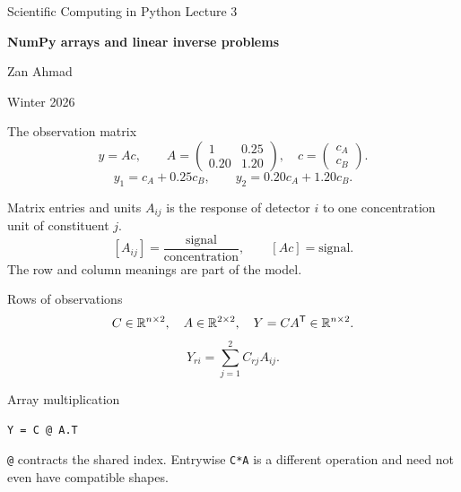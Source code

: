 \documentclass[aspectratio=169,11pt]{beamer}
\newcommand{\notestarget}{notes.pdf}\newcommand{\noteslabel}{Notes}
\begin{document}
\begin{frame}[plain]\vfill
{\small\color{accent} Scientific Computing in Python \quad Lecture 3}\par\medskip
{\raggedright{}\LARGE\bfseries\color{ink} NumPy arrays and linear inverse problems}\par\bigskip
Zan Ahmad\par\smallskip
{\small Winter 2026}\par\vfill\end{frame}
\renewcommand{\notestarget}{notes.pdf\#note-the-observation-matrix}
\begin{frame}[t,fragile,label=slide-the-observation-matrix]{The observation matrix}
\[
y=Ac,\qquad A=\begin{pmatrix}1&0.25\\0.20&1.20\end{pmatrix},\quad c=\begin{pmatrix}c_A\\c_B\end{pmatrix}.
\]
\pause{}
\[
y_1=c_A+0.25c_B,\qquad y_2=0.20c_A+1.20c_B.
\]
\end{frame}
\renewcommand{\notestarget}{notes.pdf\#note-the-observation-matrix}
\begin{frame}[t,fragile,label=slide-matrix-entries-and-units]{Matrix entries and units}
$A_{ij}$ is the response of detector $i$ to one concentration unit of constituent $j$.
\pause{}
\[
[A_{ij}]=\frac{\text{signal}}{\text{concentration}},\qquad [Ac]=\text{signal}.
\]
The row and column meanings are part of the model.
\end{frame}
\renewcommand{\notestarget}{notes.pdf\#note-rows-of-observations}
\begin{frame}[t,fragile,label=slide-rows-of-observations]{Rows of observations}
\[
C\in\mathbb{R}^{n\times2},\quad A\in\mathbb{R}^{2\times2},\quad Y=CA^{\mathsf T}\in\mathbb{R}^{n\times2}.
\]
\pause{}
\[
Y_{ri}=\sum_{j=1}^{2}C_{rj}A_{ij}.
\]
\end{frame}
\renewcommand{\notestarget}{notes.pdf\#note-rows-of-observations}
\begin{frame}[t,fragile,label=slide-array-multiplication]{Array multiplication}
\begin{verbatim}
Y = C @ A.T
\end{verbatim}
\pause{}
\texttt{@} contracts the shared index. Entrywise \texttt{C*A} is a different operation and need not even have compatible shapes.
\end{frame}
\renewcommand{\notestarget}{notes.pdf\#note-solving-the-calibration-equations}
\end{document}
